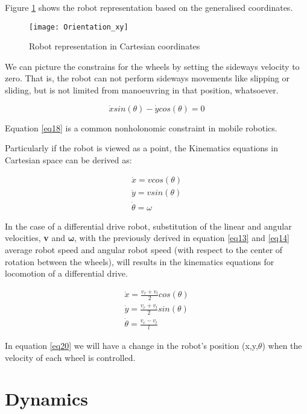 Figure \ref{fig::orientation} shows the robot representation based on the generalised coordinates.

\begin{figure}[h]
\centering
\texttt{[image: Orientation\_xy]}
\caption{Robot representation in Cartesian coordinates}
\label{fig::orientation}
\end{figure}

We can picture the constrains for the wheels by setting the sideways velocity to zero. That is, the robot can not perform sideways movements like slipping or sliding, but is not limited from manoeuvring in that position, whatsoever. 

\begin{equation} \label{eq18}
\dot{x}sin(\theta) - \dot{y}cos(\theta) = 0
\end{equation}

Equation \ref{eq18} is a common nonholonomic constraint in mobile robotics.\cite{NonHB}

Particularly if the robot is viewed as a point, the Kinematics equations in Cartesian space can be derived as:

\begin{align}
\dot{x} = vcos(\theta) \nonumber \\
\dot{y} = vsin(\theta) \label{eq19} \\
\dot{\theta} = \omega  \nonumber 
\end{align}

In the case of a differential drive robot, substitution of the linear and angular velocities, \textbf{v} and $\boldsymbol{\omega}$, with the previously derived in equation \ref{eq13} and \ref{eq14} average robot speed and angular robot speed (with respect to the center of rotation between the wheels), will results in the kinematics equations for locomotion of a differential drive. 

\begin{align}
\dot{x} = \frac{v_r + v_l}{2}cos(\theta) \nonumber \\
\dot{y} = \frac{v_r + v_l}{2}sin(\theta) \label{eq20} \\
\dot{\theta} = \frac{v_r - v_l}{l} \nonumber
\end{align}

In equation \ref{eq20} we will have a change in the robot's position (x,y,$\theta$) when the velocity of each wheel is controlled. 

\section{Dynamics} \label{dc_math}

